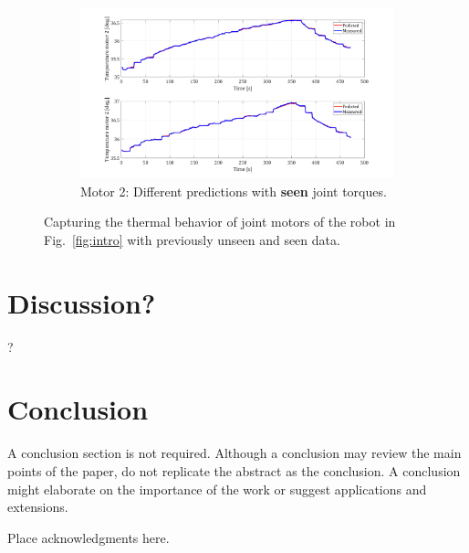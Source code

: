 \documentclass{ifacconf}
\begin{document}
\begin{figure}[t!]
\begin{subfigure}[t]{\columnwidth}
	\includegraphics[height=2.in]{./pictures/applications/J2.png}
	\caption{Motor 2: Different predictions with \textbf{seen} joint torques.}
\end{subfigure}
	\caption{Capturing the thermal behavior of joint motors of the robot in Fig.~\ref{fig:intro} with previously unseen and seen data.}
\end{figure}

\section{Discussion?}
?
\section{Conclusion}

A conclusion section is not required. Although a conclusion may review
the main points of the paper, do not replicate the abstract as the
conclusion. A conclusion might elaborate on the importance of the work
or suggest applications and extensions.

\begin{ack}
Place acknowledgments here.
\end{ack}

                                                   


\end{document}
